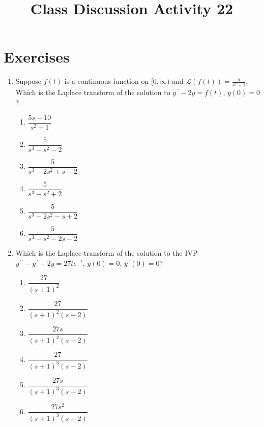 \documentclass{ximera}
\begin{document}
\begin{abstract}
 \end{abstract}

    \title{Class Discussion Activity 22}
    
    \maketitle

\section*{Exercises}

\begin{enumerate}[label=(\arabic*)]


\item Suppose $f(t)$ is a continuous function on $[0,\infty)$ and $\mathcal{L}(f(t))=\frac{5}{s^2+1}$.  Which is the Laplace transform of the solution to $y\,^{\prime}-2y=f(t)$, $y(0)=0$?

\begin{enumerate}[label=(\alph*)]
\item $\dfrac{5s-10}{s^2+1}$
\item $\dfrac{5}{s^3-s^2-2}$
\item $\dfrac{5}{s^3-2s^2+s-2}$  %
\item $\dfrac{5}{s^3-s^2+2}$
\item $\dfrac{5}{s^3-2s^2-s+2}$ 
\item $\dfrac{5}{s^3-s^2-2s-2}$ 
\end{enumerate}


\item Which is the Laplace transform of the solution to the IVP \\$y^{\,\prime\prime}-y^{\,\prime}-2y=27te^{-t}$, $y(0)=0$, $y^{\,\prime}(0)=0$?

\begin{enumerate}[label=(\alph*)]
\item $\dfrac{27}{(s+1)^2}$
\item $\dfrac{27}{(s+1)^2(s-2)}$
\item $\dfrac{27s}{(s+1)^2(s-2)}$
\item $\dfrac{27}{(s+1)^3(s-2)}$  %
\item $\dfrac{27s}{(s+1)^3(s-2)}$ 
\item $\dfrac{27s^2}{(s+1)^3(s-2)}$
\end{enumerate}


\end{enumerate}
\end{document}
